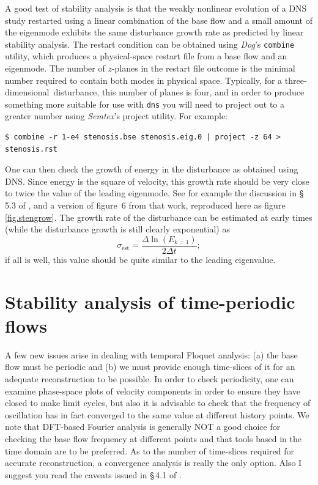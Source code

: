 \documentclass[11pt,a4paper]{report}
\newcommand\threed{three-di\-men\-sion\-al}
\newcommand{\eg}{e.g.\ }
\newcommand{\Semtex}{\emph{Semtex}}
\newcommand{\Dog}{\emph{Dog}}
\begin{document}
A good test of stability analysis is that the weakly nonlinear
evolution of a DNS study restarted using a linear combination of the
base flow and a small amount of the eigenmode exhibits the same
disturbance growth rate as predicted by linear stability analysis.  The
restart condition can be obtained using \Dog's \verb|combine| utility,
which produces a physical-space restart file from a base flow and an
eigenmode.  The number of $z$-planes in the restart file outcome is
the minimal number required to contain both modes in physical space.
Typically, for a \threed\ disturbance, this number of planes is four,
and in order to produce something more suitable for use with
\verb|dns| you will need to project out to a greater number using
\Semtex's project utility.  For example:
\begin{verbatim}
$ combine -r 1-e4 stenosis.bse stenosis.eig.0 | project -z 64 > stenosis.rst
\end{verbatim}

One can then check the growth of energy in the disturbance as obtained
using DNS.  Since energy is the square of velocity, this growth rate
should be very close to twice the value of the leading eigenmode.  See
for example the discussion in \S\,5.3 of \citet{shbl05}, and a version
of figure~6 from that work, reproduced here as
figure\,\ref{fig.stengrow}.  The growth rate of the disturbance can be
estimated at early times (while the disturbance growth is still
clearly exponential) as
\begin{equation}
  \sigma_\text{est} = \frac{\Delta \ln(E_{k=1})}{2\Delta t};
\end{equation}
if all is well, this value should be quite similar to the leading
eigenvalue.



\chapter{Stability analysis of time-periodic flows}
\label{ch.floquet}

A few new issues arise in dealing with temporal Floquet analysis: (a)
the base flow must be periodic and (b) we must provide enough
time-slices of it for an adequate reconstruction to be possible.  In
order to check periodicity, one can examine phase-space plots of
velocity components in order to ensure they have closed to make limit
cycles, but also it is advisable to check that the frequency of
oscillation has in fact converged to the same value at different
history points.  We note that DFT-based Fourier analysis is generally
NOT a good choice for checking the base flow frequency at different
points and that tools based in the time domain \citep[\eg
  zero-crossing analysis, see chapter~8 of][]{newland93} are to be
preferred. As to the number of time-slices required for accurate
reconstruction, a convergence analysis is really the only option.
Also I suggest you read the caveats issued in \S\,4.1 of
\citet{bbs08b}.
\end{document}
